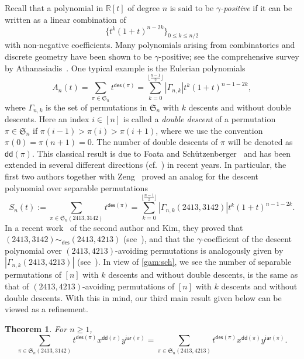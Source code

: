 \documentclass[12pt]{amsart}
\numberwithin{equation}{section}
\theoremstyle{plain}
\newtheorem{theorem}{Theorem}[section]
\theoremstyle{definition}
\newcommand{\RR}{\mathbb{R}}
\def\des{\mathsf{des}}
\def\S{\mathfrak{S}}
\def\iar{\mathsf{iar}}
\def\dd{\mathsf{dd}}
\begin{document}
Recall that a polynomial in $\RR[t]$ of degree $n$ is said to be {\em $\gamma$-positive} if it can be written as a linear combination of
$$
\{t^k(1 + t)^{n-2k}\}_{0\leq k\leq n/2}
$$
with non-negative coefficients. Many polynomials arising from  combinatorics and discrete geometry have been shown to be $\gamma$-positive; see the comprehensive  survey by Athanasiadis~\cite{ath}. One typical example is  the  Eulerian polynomials
$$
A_n(t)=\sum_{\pi\in\S_n}t^{\des(\pi)}=\sum_{k=0}^{\lfloor\frac{n-1}{2}\rfloor}|\Gamma_{n,k}|t^k(1 + t)^{n-1-2k},
$$
where $\Gamma_{n,k}$ is the set of permutations in $\S_n$ with $k$ descents and without double descents. Here an index
$i\in[n]$ is called a {\em double descent} of a permutation  $\pi\in\S_n$ if $\pi(i-1)>\pi(i)>\pi(i+1)$, where we use the convention $\pi(0)=\pi(n+1)=0$. The number of double descents of $\pi$ will be denoted as $\dd(\pi)$. This classical result is due to Foata and Sch\"utzenberger~\cite[Theorem~5.6]{FS} and has been extended in several different directions (cf.~\cite{ath}) in recent years. In particular, the first two authors together with Zeng~\cite{flz,lin} proved an analog for the descent polynomial over separable permutations 
\begin{equation}\label{gam:sch}
S_n(t):=\sum_{\pi\in\S_n(2413,3142)}t^{\des(\pi)}=\sum_{k=0}^{\lfloor\frac{n-1}{2}\rfloor}|\Gamma_{n,k}(2413,3142)|t^k(1 + t)^{n-1-2k}.
\end{equation}
In a recent work~\cite{LK} of the second author and Kim, they proved that $(2413,3142)\sim_{\des}(2413,4213)$ (see~\cite[Thm.~5.1]{LK}), and that  the $\gamma$-coefficient of the descent polynomial over $(2413,4213)$-avoiding permutations is analogously given by $|\Gamma_{n,k}(2413,4213)|$ (see~\cite[Eq.~(4.10)]{LK}). In view of \eqref{gam:sch}, we see the number of separable permutations of $[n]$ with $k$ descents and without double descents, is the same as that of $(2413,4213)$-avoiding permutations of $[n]$ with $k$ descents and without double descents. With this in mind, our third main result given below can be viewed as a refinement.

\begin{theorem} \label{thm:sep}
For $n\geq1$,
\begin{equation}\label{eq:sep}
\sum_{\pi\in\S_n(2413,3142)}t^{\des(\pi)}x^{\dd(\pi)}y^{\iar(\pi)}=\sum_{\pi\in\S_n(2413,4213)}t^{\des(\pi)}x^{\dd(\pi)}y^{\iar(\pi)}.
\end{equation} 
\end{theorem}
\end{document}
